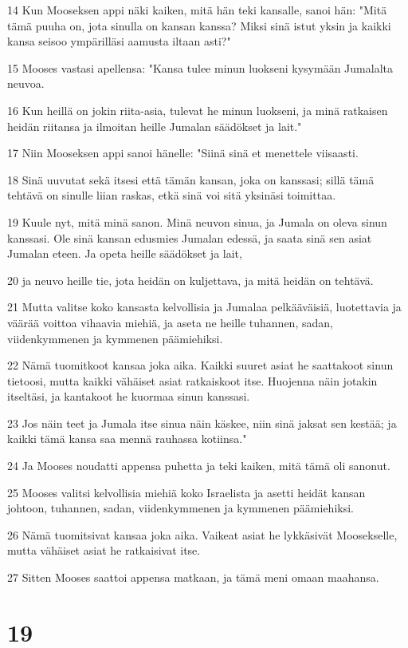 \par 14 Kun Mooseksen appi näki kaiken, mitä hän teki kansalle, sanoi hän: "Mitä tämä puuha on, jota sinulla on kansan kanssa? Miksi sinä istut yksin ja kaikki kansa seisoo ympärilläsi aamusta iltaan asti?"
\par 15 Mooses vastasi apellensa: "Kansa tulee minun luokseni kysymään Jumalalta neuvoa.
\par 16 Kun heillä on jokin riita-asia, tulevat he minun luokseni, ja minä ratkaisen heidän riitansa ja ilmoitan heille Jumalan säädökset ja lait."
\par 17 Niin Mooseksen appi sanoi hänelle: "Siinä sinä et menettele viisaasti.
\par 18 Sinä uuvutat sekä itsesi että tämän kansan, joka on kanssasi; sillä tämä tehtävä on sinulle liian raskas, etkä sinä voi sitä yksinäsi toimittaa.
\par 19 Kuule nyt, mitä minä sanon. Minä neuvon sinua, ja Jumala on oleva sinun kanssasi. Ole sinä kansan edusmies Jumalan edessä, ja saata sinä sen asiat Jumalan eteen. Ja opeta heille säädökset ja lait,
\par 20 ja neuvo heille tie, jota heidän on kuljettava, ja mitä heidän on tehtävä.
\par 21 Mutta valitse koko kansasta kelvollisia ja Jumalaa pelkääväisiä, luotettavia ja väärää voittoa vihaavia miehiä, ja aseta ne heille tuhannen, sadan, viidenkymmenen ja kymmenen päämiehiksi.
\par 22 Nämä tuomitkoot kansaa joka aika. Kaikki suuret asiat he saattakoot sinun tietoosi, mutta kaikki vähäiset asiat ratkaiskoot itse. Huojenna näin jotakin itseltäsi, ja kantakoot he kuormaa sinun kanssasi.
\par 23 Jos näin teet ja Jumala itse sinua näin käskee, niin sinä jaksat sen kestää; ja kaikki tämä kansa saa mennä rauhassa kotiinsa."
\par 24 Ja Mooses noudatti appensa puhetta ja teki kaiken, mitä tämä oli sanonut.
\par 25 Mooses valitsi kelvollisia miehiä koko Israelista ja asetti heidät kansan johtoon, tuhannen, sadan, viidenkymmenen ja kymmenen päämiehiksi.
\par 26 Nämä tuomitsivat kansaa joka aika. Vaikeat asiat he lykkäsivät Moosekselle, mutta vähäiset asiat he ratkaisivat itse.
\par 27 Sitten Mooses saattoi appensa matkaan, ja tämä meni omaan maahansa.

\chapter{19}

